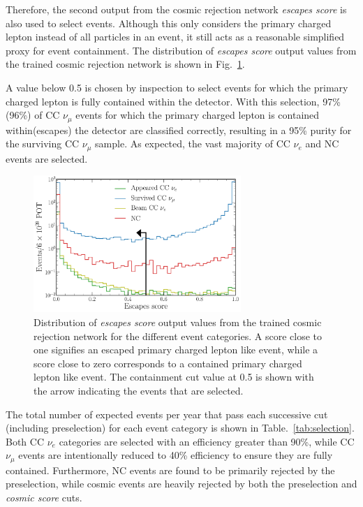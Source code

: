Therefore, the second output from the cosmic rejection network \emph{escapes score} is also used
to select events. Although this only considers the primary charged lepton instead of all particles
in an event, it still acts as a reasonable simplified proxy for event containment. The
distribution of \emph{escapes score} output values from the trained cosmic rejection network is
shown in Fig.~\ref{fig:final_escapes_outputs}.

A value below 0.5 is chosen by inspection to select events for which the primary charged lepton is
fully contained within the detector. With this selection, 97\%(96\%) of CC $\nu_{\mu}$ events for
which the primary charged lepton is contained within(escapes) the detector are classified
correctly, resulting in a 95\% purity for the surviving CC $\nu_{\mu}$ sample. As expected, the
vast majority of CC $\nu_{e}$ and NC events are selected.

\begin{figure} %
    \includegraphics[width=0.7\textwidth]{diagrams/6-cvn/chipsnet/final_escapes_outputs.pdf}
    \caption[Distribution of escapes score output values.]
    {Distribution of \emph{escapes score} output values from the trained cosmic rejection network
        for the different event categories. A score close to one signifies an escaped primary
        charged lepton like event, while a score close to zero corresponds to a contained primary
        charged lepton like event. The containment cut value at 0.5 is shown with the arrow
        indicating the events that are selected.}
    \label{fig:final_escapes_outputs}
\end{figure}

The total number of expected events per year that pass each successive cut (including
preselection) for each event category is shown in Table.~\ref{tab:selection}. Both CC $\nu_{e}$
categories are selected with an efficiency greater than 90\%, while CC $\nu_{\mu}$ events are
intentionally reduced to 40\% efficiency to ensure they are fully contained. Furthermore, NC
events are found to be primarily rejected by the preselection, while cosmic events are heavily
rejected by both the preselection and \emph{cosmic score} cuts.

